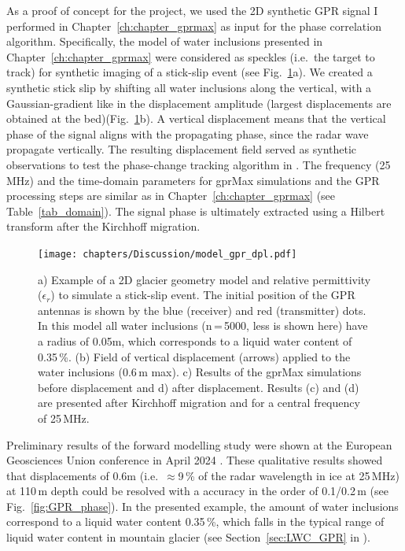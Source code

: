 As a proof of concept for the project, we used the 2D synthetic GPR signal I performed in Chapter~\ref{ch:chapter_gprmax} as input for the phase correlation algorithm. Specifically, the model of water inclusions presented in Chapter~\ref{ch:chapter_gprmax} were considered as speckles (i.e.\ the target to track) for synthetic imaging of a stick-slip event (see Fig.~\ref{fig:GPR_geometrie_dpl}a). We created a synthetic stick slip by shifting all water inclusions along the vertical, with a Gaussian-gradient like in the displacement amplitude (largest displacements are obtained at the bed)(Fig.~\ref{fig:GPR_geometrie_dpl}b). A vertical displacement means that the vertical phase of the signal aligns with the propagating phase, since the radar wave propagate vertically. The resulting displacement field served as synthetic observations to test the phase-change tracking algorithm in \cite{Aichele2019}. The frequency (25\,MHz) and the time-domain parameters for gprMax simulations and the GPR processing steps are similar as in Chapter~\ref{ch:chapter_gprmax} (see Table~\ref{tab_domain}). The signal phase is ultimately extracted using a Hilbert transform after the Kirchhoff migration.


\begin{figure}[h]
    \centering
    \texttt{[image: chapters/Discussion/model\_gpr\_dpl.pdf]}
    \caption{a) Example of a 2D glacier geometry model and relative permittivity ($\epsilon_r$) to simulate a stick-slip event. The initial position of the GPR antennas is shown by the blue (receiver) and red (transmitter) dots. In this model all water inclusions (n\,=\,5000, less is shown here) have a radius of 0.05m, which corresponds to a liquid water content of 0.35\,\%. (b) Field of vertical displacement (arrows) applied to the water inclusions (0.6\,m max). c) Results of the gprMax simulations before displacement and d) after displacement. Results (c) and (d) are presented after Kirchhoff migration and for a central frequency of 25\,MHz.}
    \label{fig:GPR_geometrie_dpl}
\end{figure}


Preliminary results of the forward modelling study were shown at the European Geosciences Union conference in April 2024 \citep{Aichele&al2024}. These qualitative results showed that displacements of 0.6m (i.e.\ $\approx$9\,\% of the radar wavelength in ice at 25\,MHz) at 110\,m depth could be resolved with a accuracy in the order of 0.1/0.2\,m (see Fig.~\ref{fig:GPR_phase}). In the presented example, the amount of water inclusions correspond to a liquid water content 0.35\,\%, which falls in the typical range of liquid water content in mountain glacier (see Section~\ref{sec:LWC_GPR} in \citep{Ogier&al2023}).



